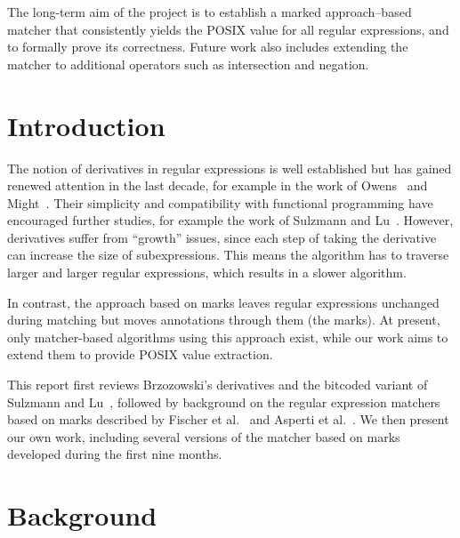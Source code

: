 \documentclass[12pt]{article}
\begin{document}
The long-term aim of the project is to establish a marked approach--based matcher that consistently yields the POSIX value for all regular expressions, and to formally prove its correctness.  
Future work also includes extending the matcher to additional operators such as intersection and negation.  

\newpage

\tableofcontents

\newpage

\section{Introduction}

The notion of derivatives in regular expressions is well established but has gained renewed 
attention in the last decade, for example in the work of Owens~\cite{Owens2009} and Might~\cite{Might2011}.
Their simplicity and compatibility with functional programming have encouraged further studies, 
for example the work of Sulzmann and Lu~\cite{Sulzmann2014}.  
However, derivatives suffer from “growth” issues, since each step of taking the derivative 
can increase the size of subexpressions. This means the algorithm has to traverse larger and 
larger regular expressions, which results in a slower algorithm.  

In contrast, the approach based on marks leaves regular expressions unchanged during matching but moves 
annotations through them (the marks). At present, only matcher-based algorithms using this approach exist,
 while our work aims to extend them to provide POSIX value extraction. 

This report first reviews Brzozowski's derivatives and the bitcoded variant of 
Sulzmann and Lu~\cite{Sulzmann2014}, followed by background on the regular 
expression matchers based on marks described by Fischer et al.~\cite{Fischer2010} 
and Asperti et al.~\cite{Asperti2010}.  
We then present our own work, including several versions of the matcher based 
on marks developed during the first nine months.

\section{Background}
\end{document}
